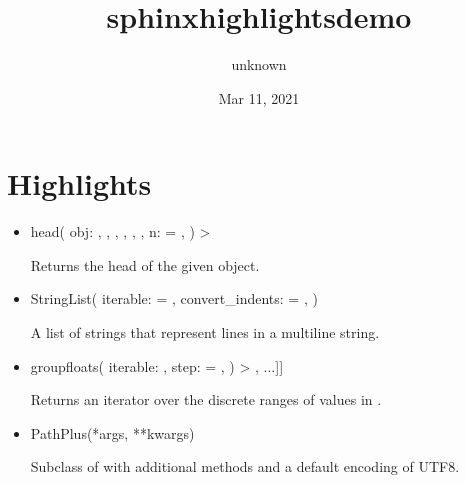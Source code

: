 \documentclass[letterpaper,10pt,english]{sphinxmanual}
\title{sphinx\sphinxhyphen{}highlights\sphinxhyphen{}demo}
\date{Mar 11, 2021}
\author{unknown}
\begin{document}
\pagestyle{empty}
\sphinxmaketitle
\pagestyle{plain}
\sphinxtableofcontents
\pagestyle{normal}
\label{\detokenize{index::doc}}



\chapter{Highlights}
\label{\detokenize{index:highlights}}\label{\detokenize{index:sphinx-highlights-0}}\begin{itemize}
\item {}
\begin{sphinxalltt}
head(
  obj: \sphinxcode{\sphinxupquote{Union}}{[}, , , , , \sphinxcode{\sphinxupquote{HasHead}}{]},
  n:  = ,
  ) \sphinxhyphen{}\textgreater{} \sphinxcode{\sphinxupquote{Optional}}{[}\sphinxcode{\sphinxupquote{str}}{]}
\end{sphinxalltt}

Returns the head of the given object.

\item {}
\begin{sphinxalltt}
StringList(
  iterable: \sphinxcode{\sphinxupquote{Iterable}}{[}\sphinxcode{\sphinxupquote{String}}{]} = \sphinxcode{\sphinxupquote{()}},
  convert\_indents:  = ,
  )
\end{sphinxalltt}

A list of strings that represent lines in a multiline string.

\item {}
\begin{sphinxalltt}
groupfloats(
  iterable: \sphinxcode{\sphinxupquote{Iterable}}{[}\sphinxcode{\sphinxupquote{float}}{]},
  step:  = ,
  ) \sphinxhyphen{}\textgreater{} \sphinxcode{\sphinxupquote{Iterable}}{[}\sphinxcode{\sphinxupquote{Tuple}}{[}, ...{]}{]}
\end{sphinxalltt}

Returns an iterator over the discrete ranges of values in .

\item {}
\begin{sphinxalltt}
PathPlus(*args, **kwargs)
\end{sphinxalltt}

Subclass of  with additional methods and a default encoding of UTF\sphinxhyphen{}8.

\end{itemize}



\renewcommand{\indexname}{Index}
\printindex
\end{document}
